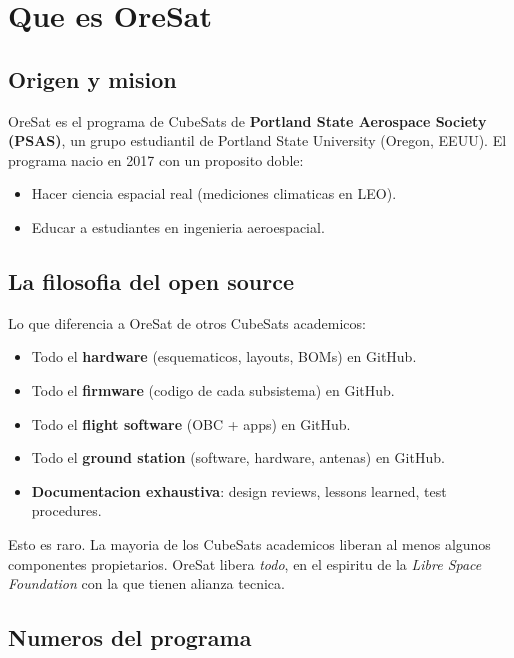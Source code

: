 \documentclass[11pt,a4paper,oneside]{report}
\begin{document}
\tableofcontents
\clearpage

\chapter{Que es OreSat}

\section{Origen y mision}

OreSat es el programa de CubeSats de \textbf{Portland State Aerospace
Society (PSAS)}, un grupo estudiantil de Portland State University
(Oregon, EEUU). El programa nacio en 2017 con un proposito doble:

\begin{itemize}[leftmargin=2em]
  \item Hacer ciencia espacial real (mediciones climaticas en LEO).
  \item Educar a estudiantes en ingenieria aeroespacial.
\end{itemize}

\section{La filosofia del open source}

Lo que diferencia a OreSat de otros CubeSats academicos:

\begin{itemize}[leftmargin=2em]
  \item Todo el \textbf{hardware} (esquematicos, layouts, BOMs) en GitHub.
  \item Todo el \textbf{firmware} (codigo de cada subsistema) en GitHub.
  \item Todo el \textbf{flight software} (OBC + apps) en GitHub.
  \item Todo el \textbf{ground station} (software, hardware, antenas) en GitHub.
  \item \textbf{Documentacion exhaustiva}: design reviews, lessons learned,
        test procedures.
\end{itemize}

Esto es raro. La mayoria de los CubeSats academicos liberan al menos
algunos componentes propietarios. OreSat libera \emph{todo}, en el
espiritu de la \emph{Libre Space Foundation} con la que tienen alianza
tecnica.

\section{Numeros del programa}
\end{document}
